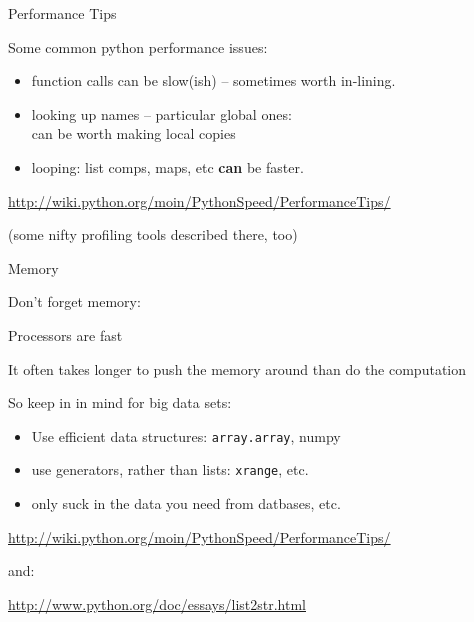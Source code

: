 \documentclass{beamer}
\begin{document}
\begin{frame}[fragile]{Performance Tips}

\vfill
{\Large Some common python performance issues:}

\begin{itemize}
  \item function calls can be slow(ish) -- sometimes worth in-lining.
  \item looking up names -- particular global ones:\\
        can be worth making local copies
  \item looping: list comps, maps, etc {\bf can} be faster.
\end{itemize}

\vfill
\url{http://wiki.python.org/moin/PythonSpeed/PerformanceTips/}

\vfill
(some nifty profiling tools described there, too)

\end{frame} 

\begin{frame}[fragile]{Memory}

\vfill
{\LARGE Don't forget memory:}

\vfill
{\Large Processors are fast}

\vfill
{\Large It often takes longer to push the memory around than do the computation}

\vfill
{\Large So keep in in mind for big data sets:}
\begin{itemize}
   \item Use efficient data structures: \verb|array.array|, numpy
   \item use generators, rather than lists: \verb|xrange|, etc.
   \item only suck in the data you need from datbases, etc.  
\end{itemize}


\vfill
\url{http://wiki.python.org/moin/PythonSpeed/PerformanceTips/}

and:

\url{http://www.python.org/doc/essays/list2str.html}

\end{frame} 
\end{document}
